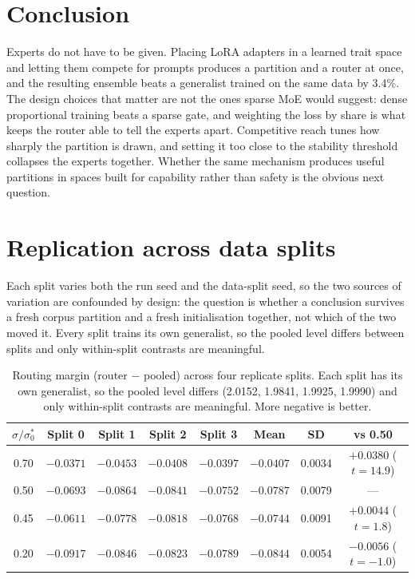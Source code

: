 \documentclass{article}
\begin{document}
\section{Conclusion}
Experts do not have to be given. Placing LoRA adapters in a learned trait space and letting them
compete for prompts produces a partition and a router at once, and the resulting ensemble beats a
generalist trained on the same data by 3.4\%. The design choices that matter are not the ones sparse
MoE would suggest: dense proportional training beats a sparse gate, and weighting the loss by share
is what keeps the router able to tell the experts apart. Competitive reach tunes how sharply the
partition is drawn, and setting it too close to the stability threshold collapses the experts
together. Whether the same mechanism produces useful partitions in spaces built for capability rather
than safety is the obvious next question.

\appendix
\section{Replication across data splits}
\label{app:rep}
Each split varies both the run seed and the data-split seed, so the two sources of variation are
confounded by design: the question is whether a conclusion survives a fresh corpus partition and a
fresh initialisation together, not which of the two moved it. Every split trains its own generalist,
so the pooled level differs between splits and only within-split contrasts are meaningful.

\begin{table}[t]
\centering
\caption{Routing margin (router $-$ pooled) across four replicate splits. Each split has its own
generalist, so the pooled level differs (2.0152, 1.9841, 1.9925, 1.9990) and only within-split
contrasts are meaningful. More negative is better.}
\label{tab:rep}
\small
\begin{tabular}{cccccccc}
\toprule
$\sigma/\sigma_0^*$ & Split 0 & Split 1 & Split 2 & Split 3 & Mean & SD & vs 0.50 \\
\midrule
0.70 & $-0.0371$ & $-0.0453$ & $-0.0408$ & $-0.0397$ & $-0.0407$ & 0.0034 & $+0.0380$ ($t=14.9$) \\
0.50 & $-0.0693$ & $-0.0864$ & $-0.0841$ & $-0.0752$ & $-0.0787$ & 0.0079 & --- \\
0.45 & $-0.0611$ & $-0.0778$ & $-0.0818$ & $-0.0768$ & $-0.0744$ & 0.0091 & $+0.0044$ ($t=1.8$) \\
0.20 & $-0.0917$ & $-0.0846$ & $-0.0823$ & $-0.0789$ & $-0.0844$ & 0.0054 & $-0.0056$ ($t=-1.0$) \\
\bottomrule
\end{tabular}
\end{table}
\end{document}
